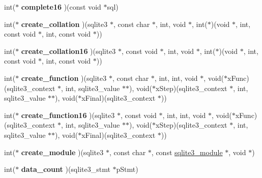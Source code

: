 \begin{DoxyCompactItemize}
int($\ast$ {\bfseries complete16} )(const void $\ast$sql)
\item 
\mbox{\label{structsqlite3__api__routines_a923433105b84b919ea359ef320da55b1}} 
int($\ast$ {\bfseries create\+\_\+collation} )(sqlite3 $\ast$, const char $\ast$, int, void $\ast$, int($\ast$)(void $\ast$, int, const void $\ast$, int, const void $\ast$))
\item 
\mbox{\label{structsqlite3__api__routines_ab3fe60d5c018e3ffcad08bec34dc53e7}} 
int($\ast$ {\bfseries create\+\_\+collation16} )(sqlite3 $\ast$, const void $\ast$, int, void $\ast$, int($\ast$)(void $\ast$, int, const void $\ast$, int, const void $\ast$))
\item 
\mbox{\label{structsqlite3__api__routines_a9f15bf465292b7176eddbf0287c770f8}} 
int($\ast$ {\bfseries create\+\_\+function} )(sqlite3 $\ast$, const char $\ast$, int, int, void $\ast$, void($\ast$x\+Func)(sqlite3\+\_\+context $\ast$, int, sqlite3\+\_\+value $\ast$$\ast$), void($\ast$x\+Step)(sqlite3\+\_\+context $\ast$, int, sqlite3\+\_\+value $\ast$$\ast$), void($\ast$x\+Final)(sqlite3\+\_\+context $\ast$))
\item 
\mbox{\label{structsqlite3__api__routines_a2cb97ce7512759a08f1744e24cd0294f}} 
int($\ast$ {\bfseries create\+\_\+function16} )(sqlite3 $\ast$, const void $\ast$, int, int, void $\ast$, void($\ast$x\+Func)(sqlite3\+\_\+context $\ast$, int, sqlite3\+\_\+value $\ast$$\ast$), void($\ast$x\+Step)(sqlite3\+\_\+context $\ast$, int, sqlite3\+\_\+value $\ast$$\ast$), void($\ast$x\+Final)(sqlite3\+\_\+context $\ast$))
\item 
\mbox{\label{structsqlite3__api__routines_a0d2bee02b4c2ce95aa3ae6d4b904bff6}} 
int($\ast$ {\bfseries create\+\_\+module} )(sqlite3 $\ast$, const char $\ast$, const \mbox{\hyperlink{structsqlite3__module}{sqlite3\+\_\+module}} $\ast$, void $\ast$)
\item 
\mbox{\label{structsqlite3__api__routines_a4d248c8b990dc7b96c5734ec878508a0}} 
int($\ast$ {\bfseries data\+\_\+count} )(sqlite3\+\_\+stmt $\ast$p\+Stmt)
\item 
\mbox{\label{structsqlite3__api__routines_a202912ed0777c34ef98ab262204d0c6e}} 

\end{DoxyCompactItemize}
